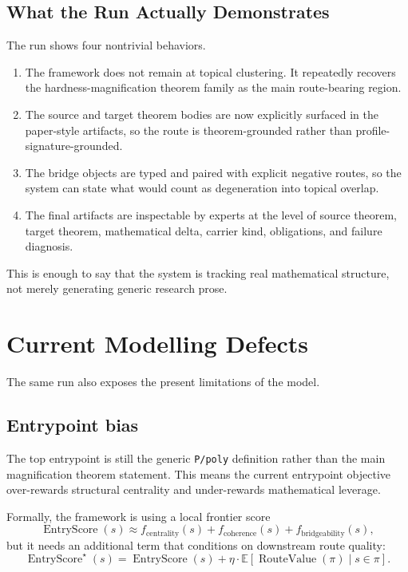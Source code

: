 \documentclass[11pt]{article}
\begin{document}
\subsection{What the Run Actually Demonstrates}

The run shows four nontrivial behaviors.

\begin{enumerate}[leftmargin=*,itemsep=0.3em]
\item The framework does not remain at topical clustering. It repeatedly recovers the hardness-magnification theorem family as the main route-bearing region.
\item The source and target theorem bodies are now explicitly surfaced in the paper-style artifacts, so the route is theorem-grounded rather than profile-signature-grounded.
\item The bridge objects are typed and paired with explicit negative routes, so the system can state what would count as degeneration into topical overlap.
\item The final artifacts are inspectable by experts at the level of source theorem, target theorem, mathematical delta, carrier kind, obligations, and failure diagnosis.
\end{enumerate}

This is enough to say that the system is tracking real mathematical structure, not merely generating generic research prose.

\section{Current Modelling Defects}

The same run also exposes the present limitations of the model.

\subsection{Entrypoint bias}

The top entrypoint is still the generic \texttt{P/poly} definition rather than the main magnification theorem statement. This means the current entrypoint objective over-rewards structural centrality and under-rewards mathematical leverage.

Formally, the framework is using a local frontier score
\[
\operatorname{EntryScore}(s) \approx f_{\mathrm{centrality}}(s) + f_{\mathrm{coherence}}(s) + f_{\mathrm{bridgeability}}(s),
\]
but it needs an additional term that conditions on downstream route quality:
\[
\operatorname{EntryScore}^{\star}(s)
=
\operatorname{EntryScore}(s)
+
\eta \cdot \mathbb{E}[\operatorname{RouteValue}(\pi) \mid s \in \pi].
\]
\end{document}
